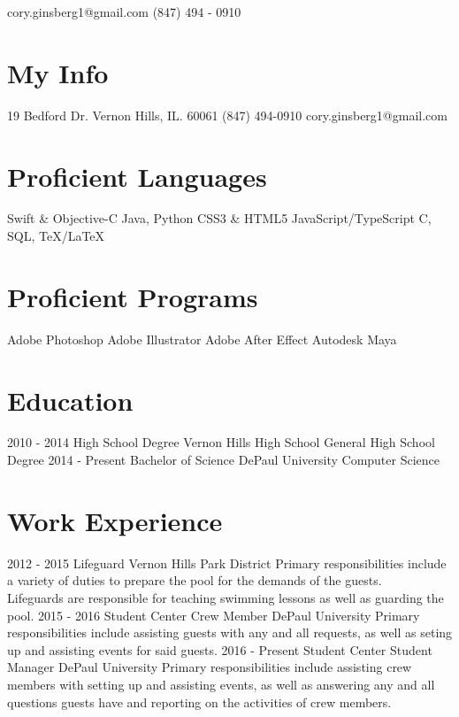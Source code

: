 \documentclass[]{resume-class}
\begin{document}
       {cory.ginsberg1@gmail.com \textbullet \hspace{0.01cm} (847) 494 - 0910}


\begin{aside}
  \section{My Info}
    19 Bedford Dr.
    Vernon Hills, IL.
    60061
    (847) 494-0910
    cory.ginsberg1@gmail.com
  \section{Proficient Languages}
    Swift \& Objective-C
    Java, Python
    CSS3 \& HTML5
    JavaScript/TypeScript
    C, SQL, TeX/LaTeX
  \section{Proficient Programs}
    Adobe Photoshop
    Adobe Illustrator
    Adobe After Effect
    Autodesk Maya
\end{aside}

\section{Education}

\begin{entrylist}
  \entry
    {2010 - 2014}
    {High School Degree}
    {Vernon Hills High School}
    {General High School Degree}
  \entry
    {2014 - Present}
    {Bachelor of Science}
    {DePaul University}
    {Computer Science}
\end{entrylist}

\section{Work Experience}

\begin{entrylist}
  \entry
    {2012 - 2015}
    {Lifeguard}
    {Vernon Hills Park District}
    {Primary responsibilities include a variety of duties to prepare the pool for the demands of the guests.\\
Lifeguards are responsible for teaching swimming lessons as well as guarding the pool.}
  \entry
    {2015 - 2016}
    {Student Center Crew Member}
    {DePaul University}
    {Primary responsibilities include assisting guests with any and all requests, as well as seting up and assisting events for said guests.}
  \entry
    {2016 - Present}
    {Student Center Student Manager}
    {DePaul University}
    {Primary responsibilities include assisting crew members with setting up and assisting events, as well as answering any and all questions guests have and reporting on the activities of crew members.}
\end{entrylist}
\end{document}
